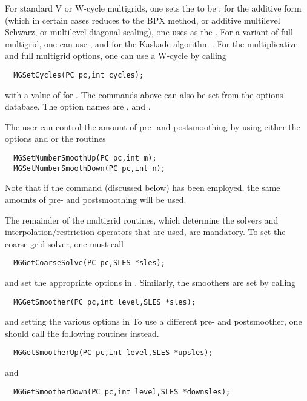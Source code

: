 For standard V or W-cycle multigrids, one sets the  to be  ; for the
additive form (which in certain cases reduces to the BPX method, or additive 
multilevel Schwarz, or multilevel diagonal scaling), one uses
  as the .  For a variant
of full multigrid, one can
 use  , and for the Kaskade 
algorithm  .
For the multiplicative and full multigrid options, one can use a
W-cycle by   calling
 
\begin{verbatim}
  MGSetCycles(PC pc,int cycles);
\end{verbatim}
with a value of  for . 
The commands above can also be set from the options database. The option 
names are ,
and  .  

The user can control the amount of pre- and postsmoothing 
  by using
either the options  
  and   or
the routines  
\begin{verbatim}
  MGSetNumberSmoothUp(PC pc,int m);
  MGSetNumberSmoothDown(PC pc,int n);
\end{verbatim}
Note that if the command  (discussed below) has
 been employed, the same amounts of pre-
and postsmoothing will be used.

The remainder of the multigrid routines, which determine
the solvers and interpolation/restriction operators that are used,
are mandatory.
To set the coarse grid solver, one must 
call 
\begin{verbatim}
  MGGetCoarseSolve(PC pc,SLES *sles);
\end{verbatim}
and set the appropriate options in . Similarly, the 
smoothers are set by calling 
\begin{verbatim}
  MGGetSmoother(PC pc,int level,SLES *sles);
\end{verbatim}
and setting the various options in  
To use a different pre- and postsmoother, one should call the following
routines instead.
\begin{verbatim}
  MGGetSmootherUp(PC pc,int level,SLES *upsles);
\end{verbatim}
and 
\begin{verbatim}
  MGGetSmootherDown(PC pc,int level,SLES *downsles);
\end{verbatim}

